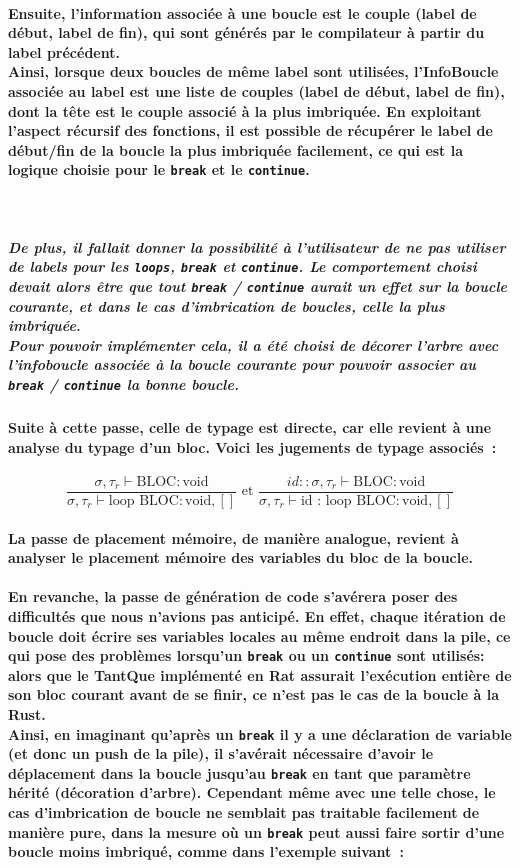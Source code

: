 \documentclass[french]{article}
\newcommand{\jugementLoop}{
        \dfrac{\sigma, \tau_r \vdash \text{BLOC} : \text{void}}
              {\sigma, \tau_r \vdash \text{loop} \text{ BLOC} : \text{void}, []}
        }
\newcommand{\jugementLoopId}{
        \dfrac{id::\sigma, \tau_r \vdash \text{BLOC} : \text{void}}
              {\sigma, \tau_r \vdash \text{id : loop} \text{ BLOC} : \text{void}, []}
        }
\begin{document}
\paragraph*{Ensuite, l'information associée à une boucle est le couple (label de début, label de fin), qui sont générés par le compilateur à partir du label précédent. \\
Ainsi, lorsque deux boucles de même label sont utilisées, l'InfoBoucle associée au label est une liste de couples 
(label de début, label de fin), dont la tête est le couple associé à la plus imbriquée.
En exploitant l'aspect récursif des fonctions, il est possible de récupérer le label de début/fin de la boucle la plus imbriquée facilement,
ce qui est la logique choisie pour le \texttt{break} et le \texttt{continue}.}\,
\subparagraph*{De plus, il fallait donner la possibilité à l'utilisateur de ne pas utiliser de labels pour les \texttt{loops}, \texttt{break} et \texttt{continue}. Le comportement
choisi devait alors être que tout \texttt{break} / \texttt{continue} aurait un effet sur la boucle courante, et dans le cas d'imbrication de boucles, celle la 
plus imbriquée.\\
Pour pouvoir implémenter cela, il a été choisi de décorer l'arbre avec l'infoboucle associée à la boucle courante pour pouvoir associer au \texttt{break} / \texttt{continue}
la bonne boucle.}
\paragraph*{Suite à cette passe, celle de typage est directe, car elle revient à une analyse
du typage d'un bloc. Voici les jugements de typage associés~:}
 \[\jugementLoop \text{ et } \jugementLoopId\]
\paragraph*{La passe de placement mémoire, de manière analogue, revient à analyser le placement mémoire des variables du bloc de la boucle.}
\paragraph*{En revanche, la passe de génération de code s'avérera poser des difficultés que nous n'avions pas anticipé. En effet, chaque itération de boucle doit
écrire ses variables locales au même endroit dans la pile, ce qui pose des problèmes lorsqu'un \texttt{break} ou un \texttt{continue} sont utilisés: alors que le TantQue
implémenté en Rat assurait l'exécution entière de son bloc courant avant de se finir, ce n'est pas le cas de la boucle à la Rust. \\
Ainsi, en imaginant qu'après un \texttt{break} il y a une déclaration de variable (et donc un push de la pile), il s'avérait nécessaire
d'avoir le déplacement dans la boucle jusqu'au \texttt{break} en tant que paramètre hérité (décoration d'arbre). Cependant même avec une telle chose, 
le cas d'imbrication de boucle ne semblait pas traitable facilement de manière pure, dans la mesure où un \texttt{break} peut aussi faire sortir d'une boucle moins imbriqué, comme dans 
l'exemple suivant~:}
\end{document}
